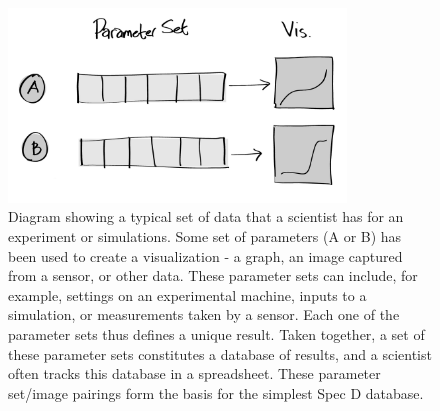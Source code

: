 \begin{figure}[h!]
\centering
\includegraphics[width=0.8\textwidth]{img/parameter_set_diagram_filled}
\caption{
    Diagram showing a typical set of data that a scientist has for an experiment or simulations. Some set of parameters (A or B) has been used to create a visualization - a graph, an image captured from a sensor, or other data. These parameter sets can include, for example, settings on an experimental machine, inputs to a simulation, or measurements taken by a sensor. Each one of the parameter sets thus defines a unique result. Taken together, a set of these parameter sets constitutes a database of results, and a scientist often tracks this database in a spreadsheet. These parameter set/image pairings form the basis for the simplest Spec D database.
}
\label{fig:parametersets}
\end{figure}
